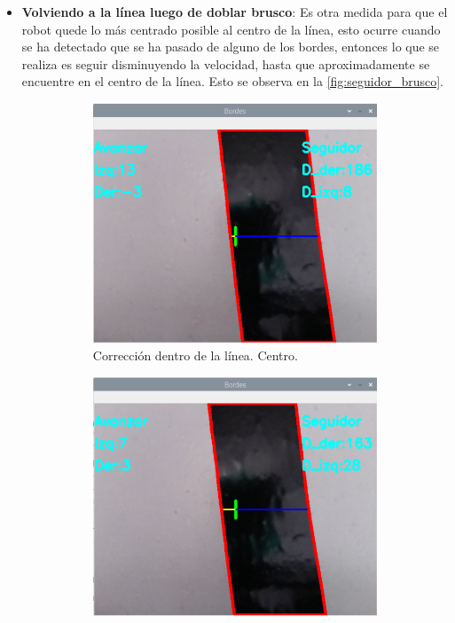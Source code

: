 \documentclass[11pt,a4paper]{article}
\begin{document}
\begin{itemize}
		\item \textbf{Volviendo a la línea luego de doblar brusco}: Es otra medida para que el robot quede lo más centrado posible al centro de la línea, esto ocurre cuando se ha detectado que se ha pasado de alguno de los bordes, entonces lo que se realiza es seguir disminuyendo la velocidad, hasta que aproximadamente se encuentre en el centro de la línea. Esto se observa en la \autoref*{fig:seguidor_brusco}.
		
		\begin{figure}[h!]
			\centering
			\begin{subfigure}{0.45\textwidth}
				\includegraphics[width=\textwidth]{imagenes/seguidor_brusco_izq1.png}
				\caption{Corrección dentro de la línea. Centro.}
				\label{subfig:seguidor_brusco_izq1}
			\end{subfigure}
			\hfill
			\begin{subfigure}{0.45\textwidth}
				\includegraphics[width=\textwidth]{imagenes/seguidor_brusco_izq2.png}

\end{subfigure}
\end{figure}
\end{itemize}
\end{document}
